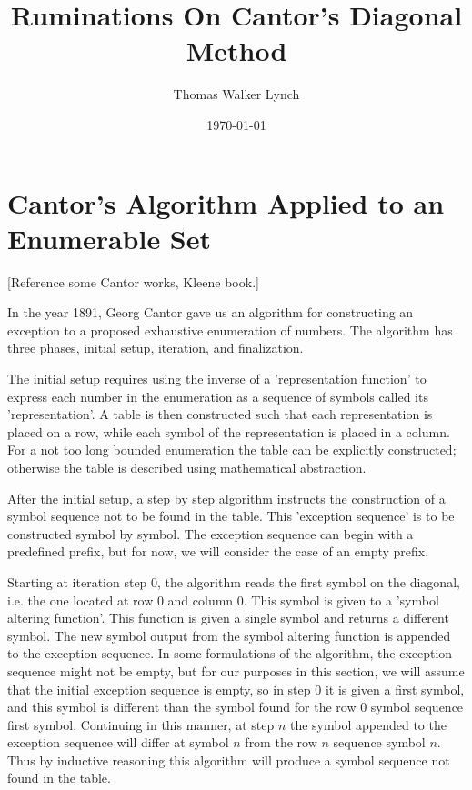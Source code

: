 \documentclass{article}
\title{Ruminations On Cantor's Diagonal Method}
\author{Thomas Walker Lynch}
\date{\today}  %
\begin{document}
	
	\maketitle

	\section{Cantor's Algorithm Applied to an Enumerable Set}
	
	[Reference some Cantor works, Kleene book.]
		
	In the year 1891, Georg Cantor gave us an algorithm for constructing an exception to a proposed exhaustive enumeration of numbers.  The algorithm has three phases, initial setup, iteration, and finalization.
	
	The initial setup requires using the inverse of a 'representation function' to express each number in the enumeration as a sequence of symbols called its 'representation'. A table is then constructed such that each representation is placed on a row, while each symbol of the representation is placed in a column.  For a not too long bounded enumeration the table can be explicitly constructed; otherwise the table is described using mathematical abstraction. 
	
	After the initial setup, a step by step algorithm instructs the construction of a symbol sequence not to be found in the table.  This 'exception sequence'  is to be constructed symbol by symbol. The exception sequence can begin with a predefined prefix, but for now, we will consider the case of an empty prefix.  
	
	Starting at iteration step 0, the algorithm reads the first symbol on the diagonal, i.e. the one located at row \(0\) and column \(0\). This symbol is given to a 'symbol altering function'.  This function is given a single symbol and returns a different symbol. The new symbol output from the symbol altering function is appended to the exception sequence. In some formulations of the algorithm, the exception sequence might not be empty, but for our purposes in this section, we will assume that the initial exception sequence is empty, so in step \(0\) it is given a first symbol, and this symbol is different than the symbol found for the row \(0\) symbol sequence first symbol.  Continuing in this manner, at step \(n\) the symbol appended to the exception sequence will differ at symbol \(n\) from the row  \(n\) sequence symbol \(n\). Thus by inductive reasoning this algorithm will produce a symbol sequence not found in the table.
	
\end{document}
